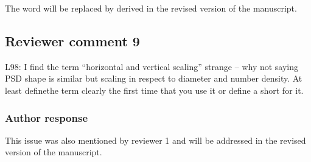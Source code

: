 \documentclass[11pt]{scrartcl}
\begin{document}
The  word will be replaced by derived in the revised version of the manuscript.



\subsection*{Reviewer comment 9}
L98: I find the term “horizontal and vertical scaling” strange – why not saying PSD shape is similar but scaling in respect to diameter and number density. At least definethe term clearly the first time that you use it or define a short for it.

\subsubsection*{Author response}
 
This issue was also mentioned by reviewer 1 and will be addressed in the revised
version of the manuscript.

%
%
%
%
%
%
%
%
%
%
%
%
%
\end{document}
